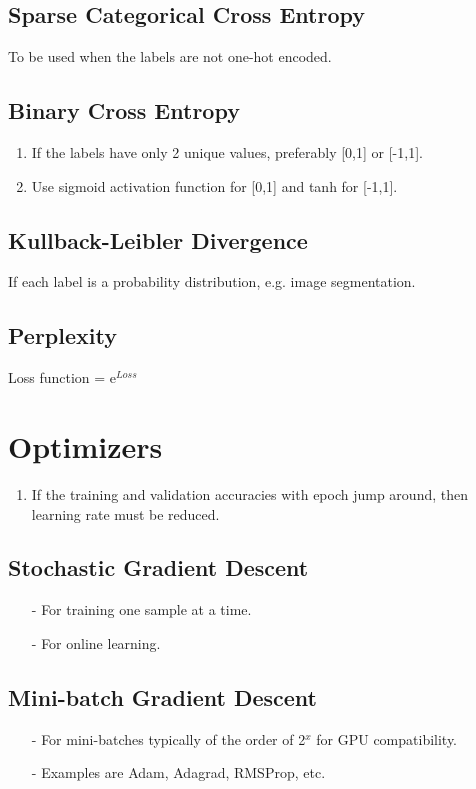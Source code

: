 \documentclass[a4paper, 12pt]{report}
\begin{document}
\section{Sparse Categorical Cross Entropy}
To be used when the labels are not one-hot encoded.
\section{Binary Cross Entropy}
\begin{enumerate}
\item If the labels have only 2 unique values, preferably [0,1] or [-1,1].
\item Use sigmoid activation function for [0,1] and tanh for [-1,1].
\end{enumerate}

\section{Kullback-Leibler Divergence}
If each label is a probability distribution, e.g. image segmentation.

\section{Perplexity}
Loss function = e$^{Loss}$
\chapter{Optimizers}
\begin{enumerate}
\item If the training and validation accuracies with epoch jump around, then learning rate must be reduced.
\end{enumerate}

\section{Stochastic Gradient Descent}
\begin{itemize}
\item[-] For training one sample at a time.

\item[-] For online learning.
\end{itemize}

\section{Mini-batch Gradient Descent}
\begin{itemize}
\item[-] For mini-batches typically of the order of 2$^x$ for GPU compatibility.
\item[-] Examples are Adam, Adagrad, RMSProp, etc.
\end{itemize}
\end{document}
